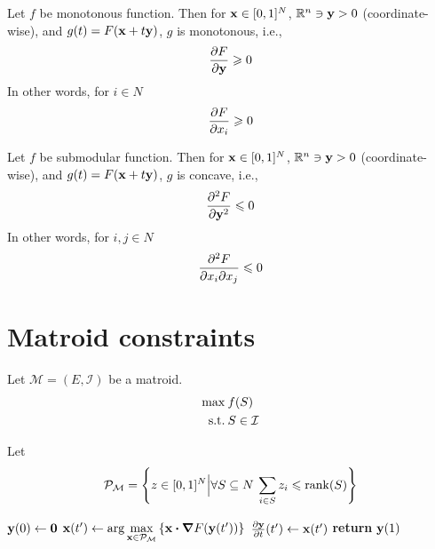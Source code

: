 
\begin{prop}
	Let $f$ be monotonous function. Then for $\vb{x}\in [0,1]^N$, $\mathbb{R}^n \ni \vb{y}>0$ (coordinate-wise), and $g(t)=F(\vb{x}+t\vb{y})$, $g$ is monotonous, i.e., 
	\begin{align}
	\pdv{F}{\vb{y}}\geqslant 0
	\end{align}
	In other words, for $i\in N$
	\begin{align}
	\pdv{F}{x_i} \geqslant  0
	\end{align}
\end{prop}
\begin{prop}
	Let $f$ be submodular function. Then for $\vb{x}\in [0,1]^N$, $\mathbb{R}^n \ni \vb{y}>0$ (coordinate-wise), and $g(t)=F(\vb{x}+t\vb{y})$, $g$ is concave, i.e., 
	\begin{align}
	\pdv[2]{F}{\vb{y}}\leqslant 0
	\end{align}
	In other words, for $i,j\in N$
	\begin{align}
	\pdv{F}{x_i}{x_j}\leqslant 0
	\end{align}
\end{prop}

\section{Matroid constraints}
Let $\mathcal{M}=(E,\mathcal{I})$ be a matroid.
\begin{align}
\max \: & f(S)\\
\text{s.t.} \: & S\in \mathcal{I}
\end{align}

Let 
\begin{align}
\mathcal{P}_\mathcal{M} = \qty{z\in [0,1]^N \Big\vert \forall S\subseteq N \: \sum_{i \in S}z_i\leqslant \rank(S)}
\end{align}

\begin{algorithm}
	\caption{}\label{alg:cont_greedy}
	\begin{algorithmic}[1]
		\State $\vb{y}(0) \gets \vb{0}$
		\State $\vb{x}(t') \gets \arg \max\limits_{\vb{x} \in \mathcal{P}_\mathcal{M}} \qty{\vb{x}\vdot \grad{F\qty(\vb{y}(t'))}} $
		\State $\pdv{\vb{y}}{t}\qty(t') \gets \vb{x}(t') $
		\EndFor
		\State \textbf{return} $\vb{y}(1)$
		\EndProcedure
	\end{algorithmic}
\end{algorithm}

